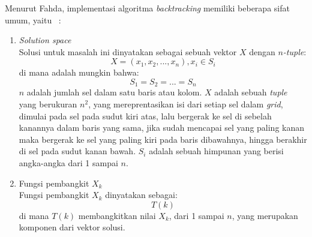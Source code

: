 Menurut Fahda, implementasi algoritma \textit{backtracking} memiliki beberapa sifat umum, yaitu ~\cite{fahda:16:backtracking}:
\begin{enumerate}
\item \textit{Solution space}
\\ Solusi untuk masalah ini dinyatakan sebagai sebuah vektor \begin{math}X\end{math} dengan \textit{\begin{math}n\end{math}-tuple}:
\begin{displaymath}
X = (x_1, x_2, ..., x_n), x_i \in S_i
\end{displaymath}
di mana adalah mungkin bahwa:
\begin{displaymath}
S_1 = S_2 = ... = S_n
\end{displaymath}
\begin{math}n\end{math} adalah jumlah sel dalam satu baris atau kolom. \begin{math}X\end{math} adalah sebuah \textit{tuple} yang berukuran \begin{math}n^2\end{math}, yang mereprentasikan isi dari setiap sel dalam \textit{grid}, dimulai pada sel pada sudut kiri atas, lalu bergerak ke sel di sebelah kanannya dalam baris yang sama, jika sudah mencapai sel yang paling kanan maka bergerak ke sel yang paling kiri pada baris dibawahnya, hingga berakhir di sel pada sudut kanan bawah. \begin{math}S_i\end{math} adalah sebuah himpunan yang berisi angka-angka dari 1 sampai \begin{math}n\end{math}.
\item Fungsi pembangkit \begin{math}X_k\end{math}
\\ Fungsi pembangkit \begin{math}X_k\end{math} dinyatakan sebagai:
\begin{displaymath}
T(k)
\end{displaymath}
di mana \begin{math}T(k)\end{math} membangkitkan nilai \begin{math}X_k\end{math}, dari 1 sampai \begin{math}n\end{math}, yang merupakan komponen dari vektor solusi.

\end{enumerate}
